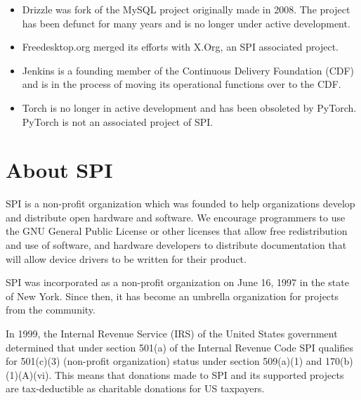 \documentclass[a4paper]{report}
\begin{document}
\begin{itemize}

\item Drizzle was fork of the MySQL project originally made in 2008.
The project has been defunct for many years and is no longer under
active development.

\item Freedesktop.org merged its efforts with X.Org, an SPI associated
project.

\item Jenkins is a founding member of the Continuous Delivery Foundation
(CDF) and is in the process of moving its operational functions over to
the CDF.

\item Torch is no longer in active development and has been obsoleted
by PyTorch.  PyTorch is not an associated project of SPI.

\end{itemize}


\appendix
\chapter{About SPI}

SPI is a non-profit organization which was founded to help organizations
develop and distribute open hardware and software. We encourage programmers
to use the GNU General Public License or other licenses that allow free
redistribution and use of software, and hardware developers to distribute
documentation that will allow device drivers to be written for their product.

SPI was incorporated as a non-profit organization on June 16, 1997 in the state
of New York. Since then, it has become an umbrella organization for projects
from the community.

In 1999, the Internal Revenue Service (IRS) of the United States government
determined that under section 501(a) of the Internal Revenue Code SPI
qualifies for 501(c)(3) (non-profit organization) status under section 509(a)(1)
and 170(b)(1)(A)(vi). This means that donations made to SPI and its
supported projects are tax-deductible as charitable donations for US taxpayers.

\newpage

\pagestyle{empty}
\end{document}
